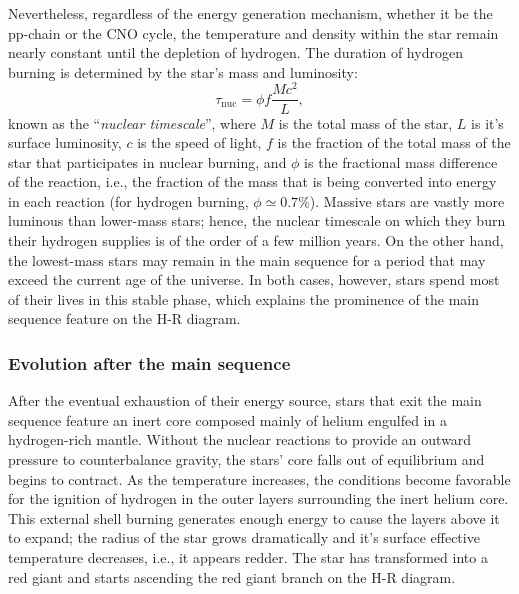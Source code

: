\documentclass[main.tex]{subfiles}
\begin{document}
    Nevertheless, regardless of the energy generation mechanism, whether it be the pp-chain or the CNO cycle, the temperature and density within the star remain nearly constant until the depletion of hydrogen. The duration of hydrogen burning is determined by the star's mass and luminosity:
    \begin{equation}
        \label{eq:nuclear_timescale}
        \tau_\mathrm{nuc} = \phi f \frac{Mc^2}{L},
    \end{equation}
    known as the ``\textit{nuclear timescale}'', where $M$ is the total mass of the star, $L$ is it's surface luminosity, $c$ is the speed of light, $f$ is the fraction of the total mass of the star that participates in nuclear burning, and $\phi$ is the fractional mass difference of the reaction, i.e., the fraction of the mass that is being converted into energy in each reaction (for hydrogen burning, $\phi \simeq 0.7\%$). Massive stars are vastly more luminous than lower-mass stars; hence, the nuclear timescale on which they burn their hydrogen supplies is of the order of a few million years. On the other hand, the lowest-mass stars may remain in the main sequence for a period that may exceed the current age of the universe. In both cases, however, stars spend most of their lives in this stable phase, which explains the prominence of the main sequence feature on the H-R diagram.
    


    \subsubsection{Evolution after the main sequence}
    After the eventual exhaustion of their energy source, stars that exit the main sequence feature an inert core composed mainly of helium engulfed in a hydrogen-rich mantle. Without the nuclear reactions to provide an outward pressure to counterbalance gravity, the stars' core falls out of equilibrium and begins to contract. As the temperature increases, the conditions become favorable for the ignition of hydrogen in the outer layers surrounding the inert helium core. This external shell burning generates enough energy to cause the layers above it to expand; the radius of the star grows dramatically and it's surface effective temperature decreases, i.e., it appears redder. The star has transformed into a red giant and starts ascending the red giant branch on the H-R diagram.
\end{document}
